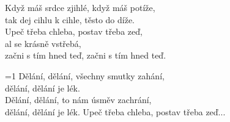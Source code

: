 \ve{}
Když máš srdce zjihlé, když máš potíže,\\
tak dej cihlu k cihle, těsto do díže.\\
Upeč třeba chleba, postav třeba zeď,\\
al se krásně vstřebá,\\
začni s tím hned teď, začni s tím hned teď.

\ve{}=1
\cho{}
Dělání, dělání, všechny smutky zahání,\\
dělání, dělání je lék.\quad\\
Dělání, dělání, to nám úsměv zachrání,\\
dělání, dělání je lék.
\ve{}
Upeč třeba chleba, postav třeba zeď...
\cho{}
\esong